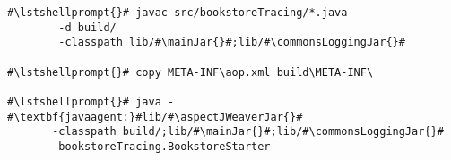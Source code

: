 \begin{lstlisting}[caption=Commands to compile and run the annotated Bookstore under Windows, label=lst:traceAnalysisCompileRunExample1Win]
#\lstshellprompt{}# javac src/bookstoreTracing/*.java
        -d build/ 
        -classpath lib/#\mainJar{}#;lib/#\commonsLoggingJar{}#

#\lstshellprompt{}# copy META-INF\aop.xml build\META-INF\

#\lstshellprompt{}# java -#\textbf{javaagent:}#lib/#\aspectJWeaverJar{}# 
       -classpath build/;lib/#\mainJar{}#;lib/#\commonsLoggingJar{}# 
        bookstoreTracing.BookstoreStarter
\end{lstlisting}
